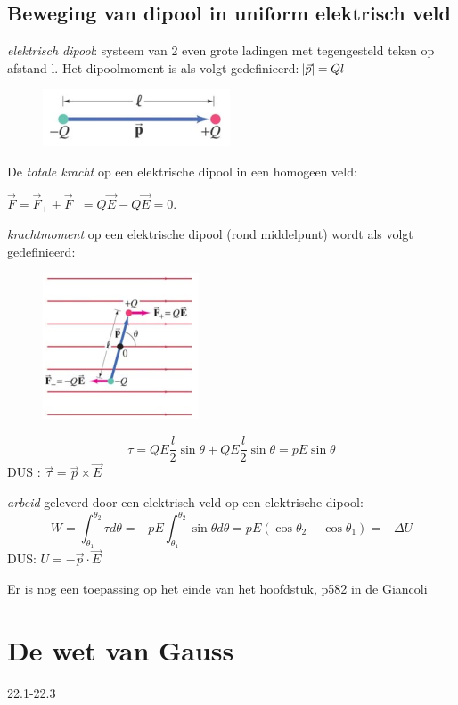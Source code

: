\documentclass[12pt,a4paper]{article}
\begin{document}
	\subsection{Beweging van dipool in uniform elektrisch veld}
	\textit{elektrisch dipool}: systeem van 2 even grote ladingen met tegengesteld teken op afstand l.
	Het dipoolmoment is als volgt gedefinieerd: \(\abs{\vec{p}} = Ql\)
	\begin{figure}[h]
		\centering
		\includegraphics[width=0.3\linewidth]{dipool}
		\label{fig:dipool}
	\end{figure}

	De \textit{totale kracht} op een elektrische dipool in een homogeen veld: 

	\(\vec{F} = \vec{F}_+ + \vec{F}_- = Q\vec{E} - Q\vec{E} = 0\).
	
	\textit{krachtmoment} op een elektrische dipool (rond middelpunt) wordt als volgt gedefinieerd:
	\begin{figure}[h]
		\centering
		\includegraphics[width=0.4\linewidth]{dippoolmoment}
		\label{fig:dippoolmoment}
	\end{figure}
	\newpage
	\[\tau = QE\frac{l}{2}\sin\theta + QE\frac{l}{2}\sin\theta = pE\sin\theta\]	
	DUS : \(\vec{\tau} = \vec{p} \times \vec{E}\)
	
	\textit{arbeid} geleverd door een elektrisch veld op een elektrische dipool:
	\[W = \int_{\theta_1}^{\theta_2}\tau d\theta = -pE\int_{\theta_1}^{\theta_2}\sin\theta d\theta = pE(\cos\theta_2 - \cos\theta_1) = -\Delta U\]
	DUS: \(U = -\vec{p} \cdot \vec{E}\)
	
	Er is nog een toepassing op het einde van het hoofdstuk, p582 in de Giancoli
	
    \section{De wet van Gauss}
    22.1-22.3
\end{document}
